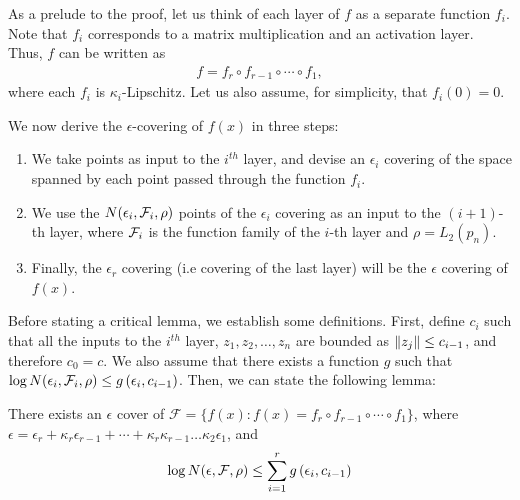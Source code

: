 As a prelude to the proof, let us think of each layer of $f$ as a separate function $f_i$. Note that $f_i$ corresponds to a matrix multiplication and an activation layer. Thus, $f$ can be written as 
\begin{align}
    f = f_r \circ f_{r-1} \circ \cdots \circ f_1,
\end{align}
where each $f_i$ is $\kappa_i$-Lipschitz. Let us also assume, for simplicity, that $f_i(0) = 0$. 

We now derive the $\epsilon$-covering of $f(x)$ in three steps:
\begin{enumerate}
    \item We take points as input to the $i^{th}$ layer, and devise an $\epsilon_i$ covering of the space spanned by each point passed through the function $f_i$.
    \item We use the $N(\epsilon_i, \mathcal F_i, \rho)$ points of the $\epsilon_i$ covering as an input to the $(i+1)$-th layer, where $\mathcal F_i$ is the function family of the $i$-th layer and $\rho = L_2(p_n)$.
    \item Finally, the $\epsilon_r$ covering (i.e covering of the last layer) will be the $\epsilon$ covering of $f(x)$.
\end{enumerate}

Before stating a critical lemma, we establish some definitions. First, define $c_i$ such that all the inputs to the $i^{th}$ layer, $z_1, z_2, \dots, z_n$ are bounded as $\|z_j\| \leq c_{i-1}$, and therefore $c_0 = c$. We also assume that there exists a function $g$ such that $\log N (\epsilon_i, \mathcal F_i, \rho) \leq g\left(\epsilon_i, c_{i-1}\right)$. Then, we can state the following lemma:

\begin{lemma}
    There exists an $\epsilon$ cover  of $\mathcal{F} = \{f(x) : f(x) = f_r \circ f_{r-1} \circ \cdots \circ f_1\}$, where $\epsilon = \epsilon_r + \kappa_r\epsilon_{r-1} + \cdots + \kappa_r\kappa_{r-1}\dots\kappa_2\epsilon_1$, and 
    \begin{align}
    \log N(\epsilon, \mathcal F, \rho) \leq \sum_{i=1}^{r} g\left(\epsilon_i, c_{i-1}\right)
    \end{align}
    \label{lec10:lma:additive_cover}
\end{lemma}


